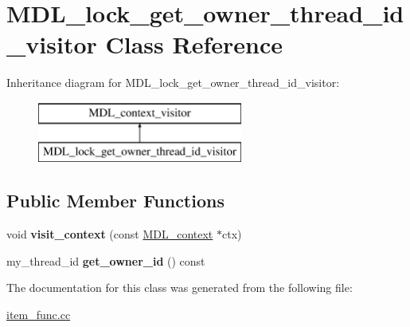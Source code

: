 \hypertarget{classMDL__lock__get__owner__thread__id__visitor}{}\section{M\+D\+L\+\_\+lock\+\_\+get\+\_\+owner\+\_\+thread\+\_\+id\+\_\+visitor Class Reference}
\label{classMDL__lock__get__owner__thread__id__visitor}
Inheritance diagram for M\+D\+L\+\_\+lock\+\_\+get\+\_\+owner\+\_\+thread\+\_\+id\+\_\+visitor\+:\begin{figure}[H]
\begin{center}
\leavevmode
\includegraphics[height=2.000000cm]{classMDL__lock__get__owner__thread__id__visitor}
\end{center}
\end{figure}
\subsection*{Public Member Functions}
\begin{DoxyCompactItemize}
\item 
\mbox{\label{classMDL__lock__get__owner__thread__id__visitor_a2f6721de96fe1a210751e6b025fb4bfe}} 
void {\bfseries visit\+\_\+context} (const \mbox{\hyperlink{classMDL__context}{M\+D\+L\+\_\+context}} $\ast$ctx)
\item 
\mbox{\label{classMDL__lock__get__owner__thread__id__visitor_adffc9f2faef158b2278ffd3dbb158b0f}} 
my\+\_\+thread\+\_\+id {\bfseries get\+\_\+owner\+\_\+id} () const
\end{DoxyCompactItemize}


The documentation for this class was generated from the following file\+:\begin{DoxyCompactItemize}
\item 
\mbox{\hyperlink{item__func_8cc}{item\+\_\+func.\+cc}}\end{DoxyCompactItemize}
